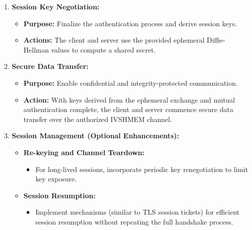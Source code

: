 \documentclass[conference]{IEEEtran}
\begin{document}
\begin{enumerate}[label=\arabic*.]
  \item \textbf{Session Key Negotiation:}
        \begin{itemize}
          \item \textbf{Purpose:} Finalize the authentication process and derive session keys.
          \item \textbf{Actions:} The client and server use the provided ephemeral Diffie-Hellman values to compute a shared secret.
        \end{itemize}

  \item \textbf{Secure Data Transfer:}
        \begin{itemize}
          \item \textbf{Purpose:} Enable confidential and integrity-protected communication.
          \item \textbf{Action:} With keys derived from the ephemeral exchange and mutual authentication complete, the client and server commence secure data transfer over the authorized IVSHMEM channel.
        \end{itemize}

  \item \textbf{Session Management (Optional Enhancements):}
        \begin{itemize}
          \item \textbf{Re-keying and Channel Teardown:}
                \begin{itemize}
                  \item For long-lived sessions, incorporate periodic key renegotiation to limit key
                        exposure.
                \end{itemize}
          \item \textbf{Session Resumption:}
                \begin{itemize}
                  \item Implement mechanisms (similar to TLS session tickets) for efficient session
                        resumption without repeating the full handshake process.
                \end{itemize}
        \end{itemize}
\end{enumerate}
\end{document}
